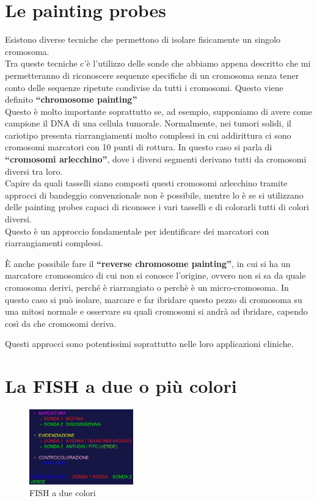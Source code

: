 \documentclass[11pt]{book}
\begin{document}
\section{Le painting probes}
Esistono diverse tecniche che permettono di isolare fisicamente un singolo cromosoma.\\
Tra queste tecniche c'è l'utilizzo delle sonde che abbiamo appena descritto che mi permetteranno di riconoscere sequenze specifiche di un cromosoma senza tener conto delle sequenze ripetute condivise da tutti i cromosomi. Questo viene definito \textbf{``chromosome painting''}\\
Questo è molto importante soprattutto se, ad esempio, supponiamo di avere come campione il DNA di una cellula tumorale. Normalmente, nei tumori solidi, il cariotipo presenta riarrangiamenti molto complessi in cui addirittura ci sono cromosomi marcatori con 10 punti di rottura. In questo caso si parla di \textbf{``cromosomi arlecchino''}, dove i diversi segmenti derivano tutti da cromosomi diversi tra loro.\\
Capire da quali tasselli siano composti questi cromosomi arlecchino tramite approcci di bandeggio convenzionale non è possibile, mentre lo è se si utilizzano delle painting probes capaci di riconosce i vari tasselli e di colorarli tutti di colori diversi.\\
Questo è un approccio fondamentale per identificare dei marcatori con riarrangiamenti complessi.

È anche possibile fare il \textbf{``reverse chromosome painting''}, in cui si ha un marcatore cromosomico di cui non si conosce l'origine, ovvero non si sa da quale cromosoma derivi, perché è riarrangiato o perchè è un micro-cromosoma. In questo caso si può isolare, marcare e far ibridare questo pezzo di cromosoma su una mitosi normale e osservare su quali cromosomi si andrà ad ibridare, capendo così da che cromosomi deriva.

Questi approcci sono potentissimi soprattutto nelle loro applicazioni cliniche.

\section{La FISH a due o più colori}

\begin{figure}
    \includegraphics[width=0.4\textwidth]{img/39_fish_due_colori.png}
  \caption{FISH a due colori}
\end{figure}
\end{document}
